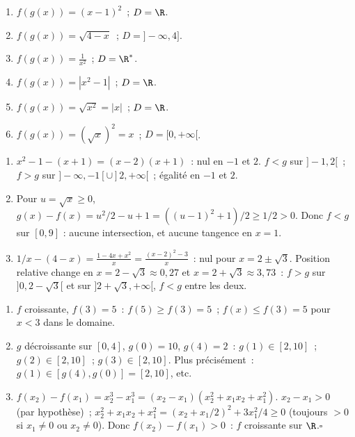 
\begin{enumerate}
  \item $f(g(x))=(x-1)^2$~; $D=\R$.
  \item $f(g(x))=\sqrt{4-x}$~; $D=]-\infty,4]$.
  \item $f(g(x))=\frac{1}{x^2}$~; $D=\R^*$.
  \item $f(g(x))=|x^2-1|$~; $D=\R$.
  \item $f(g(x))=\sqrt{x^2}=|x|$~; $D=\R$.
  \item $f(g(x))=(\sqrt{x})^2=x$~; $D=[0,+\infty[$.
\end{enumerate}


\begin{enumerate}
  \item $x^2-1-(x+1)=(x-2)(x+1)$~: nul en $-1$ et $2$.
        $f<g$ sur $]-1,2[$~; $f>g$ sur $]-\infty,-1[\cup]2,+\infty[$~; \'egalit\'e en $-1$ et $2$.
  \item Pour $u=\sqrt x\geq0$,
        $g(x)-f(x)=u^2/2-u+1=((u-1)^2+1)/2\geq1/2>0$.
        Donc $f<g$ sur $[0,9]$ : aucune intersection, et aucune tangence en $x=1$.
  \item $1/x-(4-x)=\frac{1-4x+x^2}{x}=\frac{(x-2)^2-3}{x}$~: nul pour $x=2\pm\sqrt{3}$.
        Position relative change en $x=2-\sqrt{3}\approx0{,}27$ et $x=2+\sqrt{3}\approx3{,}73$~:
        $f>g$ sur $]0,2-\sqrt3[$ et sur $]2+\sqrt3,+\infty[$, $f<g$ entre les deux.
\end{enumerate}


\begin{enumerate}
  \item $f$ croissante, $f(3)=5$~: $f(5)\geq f(3)=5$~; $f(x)\leq f(3)=5$ pour $x<3$ dans le domaine.
  \item $g$ d\'ecroissante sur $[0,4]$, $g(0)=10$, $g(4)=2$~:
        $g(1)\in[2,10]$~; $g(2)\in[2,10]$~; $g(3)\in[2,10]$.
        Plus pr\'ecis\'ement~: $g(1)\in[g(4),g(0)]=[2,10]$, etc.
  \item $f(x_2)-f(x_1)=x_2^3-x_1^3=(x_2-x_1)(x_2^2+x_1x_2+x_1^2)$.
        $x_2-x_1>0$ (par hypoth\`ese)~;
        $x_2^2+x_1x_2+x_1^2=(x_2+x_1/2)^2+3x_1^2/4\geq0$ (toujours $>0$ si $x_1\ne0$ ou $x_2\ne0$).
        Donc $f(x_2)-f(x_1)>0$~: $f$ croissante sur $\R$.\hfill$\square$
\end{enumerate}

